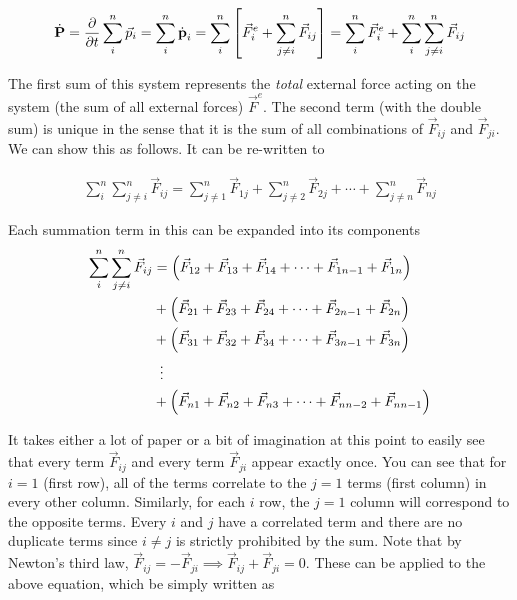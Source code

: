\begin{align}
\dot{\text{\textbf{P}}} = \frac{\partial}{\partial t}\sum_{i}^{n} \vec{p}_i = \sum_{i}^{n} \dot{\text{\textbf{p}}}_i = \sum_{i}^{n} \left[\vec{F}_i^e + \sum_{j\neq i}^{n} \vec{F}_{ij}\right] = \sum_{i}^{n} \vec{F}_i^e + \sum_{i}^{n}\sum_{j\neq i}^{n} \vec{F}_{ij} \label{angular momentum derivation 1}
\end{align}

The first sum of this system represents the \textit{total} external force acting on the system (the sum of all external forces) $\vec{F}^e$. The second term (with the double sum) is unique in the sense that it is the sum of all combinations of $\vec{F}_{ij}$ and $\vec{F}_{ji}$. We can show this as follows. It can be re-written to

\begin{align}
\sum_{i}^{n}\sum_{j\neq i}^{n} \vec{F}_{ij} = \sum_{j\neq 1}^{n} \vec{F}_{1j} + \sum_{j\neq 2}^{n} \vec{F}_{2j} + \cdots + \sum_{j\neq n}^{n} \vec{F}_{nj}
\end{align}

Each summation term in this can be expanded into its components
\begin{align}
\sum_{i}^{n}\sum_{j\neq i}^{n} \vec{F}_{ij} &= \left(\vec{F}_{12} + \vec{F}_{13} + \vec{F}_{14} +\cdots + \vec{F}_{1n-1} +\vec{F}_{1n}\right) \\ &+ \left(\vec{F}_{21} + \vec{F}_{23} + \vec{F}_{24} +\cdots + \vec{F}_{2n-1} +\vec{F}_{2n}\right)\\ &+ \left(\vec{F}_{31} + \vec{F}_{32} + \vec{F}_{34} +\cdots + \vec{F}_{3n-1} +\vec{F}_{3n}\right)\\ &\hspace{0.5em}\vdots \\ &+ \left(\vec{F}_{n1} + \vec{F}_{n2} + \vec{F}_{n3} +\cdots + \vec{F}_{nn-2} + \vec{F}_{nn-1}\right) 
\end{align}

It takes either a lot of paper or a bit of imagination at this point to easily see that every term $\vec{F}_{ij}$ and every term $\vec{F}_{ji}$ appear exactly once. You can see that for $i=1$ (first row), all of the terms correlate to the $j=1$ terms (first column) in every other column. Similarly, for each $i$ row, the $j=1$ column will correspond to the opposite terms. Every $i$ and $j$ have a correlated term and there are no duplicate terms since $i\neq j$ is strictly prohibited by the sum. Note that by Newton's third law, $\vec{F}_{ij} = -\vec{F}_{ji} \implies \vec{F}_{ij} + \vec{F}_{ji} = 0$. These can be applied to the above equation, which be simply written as

